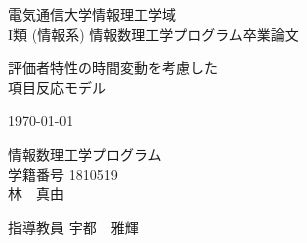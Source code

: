 \documentclass[12pt]{jarticle}
\begin{document}
\thispagestyle{empty}
\vfill
\hfill 電気通信大学情報理工学域 \\
\hfill I類 (情報系) 情報数理工学プログラム卒業論文
%
%
%
%
%
\vfill
\begin{center}
  \Large 評価者特性の時間変動を考慮した\\項目反応モデル
\end{center}
\vfill
\begin{center}
  \today
\end{center}
\vfill
\begin{center}
  \large
  情報数理工学プログラム\\[1cm]
  学籍番号 1810519\\[1cm]
  林　真由
\end{center}
\begin{center}
  指導教員 宇都　雅輝
\end{center}
\vfill
\end{document}
